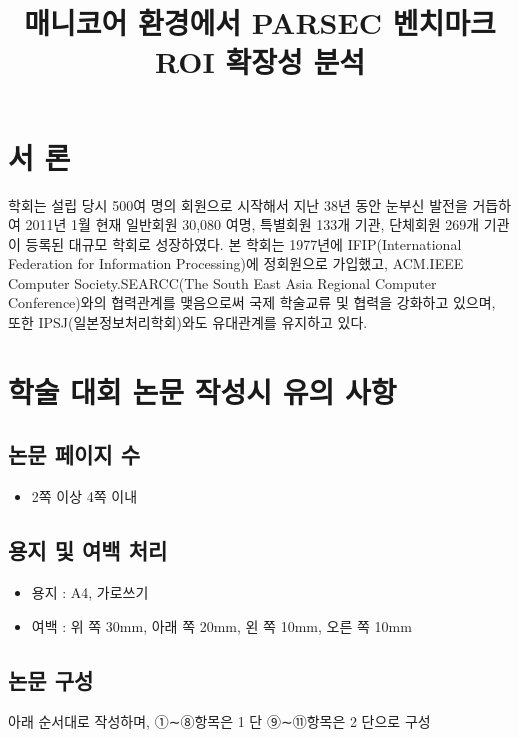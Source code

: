 \documentclass{kcc}
\title{매니코어 환경에서 PARSEC 벤치마크 ROI 확장성 분석}
\author{
}
\begin{document}
\maketitle


\section{서 론}
학회는 설립 당시 500여 명의 회원으로 시작해서 지난 38년 동안 눈부신 발전을 거듭하여 
2011년 1월 현재 일반회원 30,080 여명, 특별회원 133개 기관, 단체회원 269개 기관이 등록된 대규모 학회로 성장하였다. 
본 학회는 1977년에 IFIP(International Federation for Information Processing)에 정회원으로 가입했고, 
ACM.IEEE Computer Society.SEARCC(The South East Asia Regional Computer Conference)와의 협력관계를 맺음으로써 
국제 학술교류 및 협력을 강화하고 있으며, 또한 IPSJ(일본정보처리학회)와도 유대관계를 유지하고 있다.


\section{학술 대회 논문 작성시 유의 사항}

\subsection{논문 페이지 수}
\begin{itemize}[itemsep=0pt,parsep=0pt]
  \item 2쪽 이상 4쪽 이내 
\end{itemize}


\subsection{용지 및 여백 처리}
\begin{itemize}[itemsep=0pt,parsep=0pt]
  \item 용지 : A4, 가로쓰기
  \item 여백 : 위 쪽 30mm, 아래 쪽 20mm, 왼 쪽 10mm, 오른 쪽 10mm
\end{itemize}

\subsection{논문 구성}
아래 순서대로 작성하며, ①∼⑧항목은 1 단 ⑨∼⑪항목은 2 단으로 구성
\end{document}
